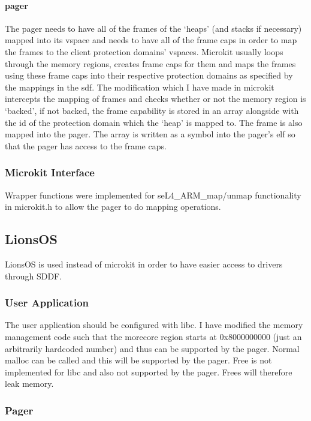 \documentclass{article}
\begin{document}
\paragraph{pager}
The pager needs to have all of the frames of the `heaps' (and stacks if necessary) mapped into its vspace and needs to have all of the frame caps in order to map the frames to the client protection domains' vspaces. Microkit usually loops through the memory regions, creates frame caps for them and maps the frames using these frame caps into their respective protection domains as specified by the mappings in the sdf. The modification which I have made in microkit intercepts the mapping of frames and checks whether or not the memory region is `backed', if not backed, the frame capability is stored in an array alongside with the id of the protection domain which the `heap' is mapped to. The frame is also mapped into the pager. The array is written as a symbol into the pager's elf so that the pager has access to the frame caps.
\subsubsection{Microkit Interface}
Wrapper functions were implemented for seL4\_ARM\_map/unmap functionality in microkit.h to allow the pager to do mapping operations.
\subsection{LionsOS}
LionsOS is used instead of microkit in order to have easier access to drivers through SDDF. 
\subsubsection{User Application}
The user application should be configured with libc. I have modified the memory management code such that the morecore region starts at 0x8000000000 (just an arbitrarily hardcoded number) and thus can be supported by the pager. Normal malloc can be called and this will be supported by the pager. Free is not implemented for libc and also not supported by the pager. Frees will therefore leak memory.
\subsubsection{Pager}
\end{document}
